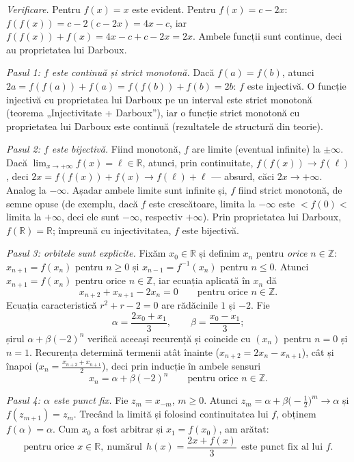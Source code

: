 \emph{Verificare.} Pentru $f(x)=x$ este evident. Pentru $f(x)=c-2x$: $f(f(x))=c-2(c-2x)=4x-c$, iar $f(f(x))+f(x)=4x-c+c-2x=2x$. Ambele funcții sunt continue, deci au proprietatea lui Darboux.

\emph{Pasul 1: $f$ este continuă și strict monotonă.} Dacă $f(a)=f(b)$, atunci $2a=f(f(a))+f(a)=f(f(b))+f(b)=2b$: $f$ este injectivă. O funcție injectivă cu proprietatea lui Darboux pe un interval este strict monotonă (teorema „Injectivitate + Darboux''), iar o funcție strict monotonă cu proprietatea lui Darboux este continuă (rezultatele de structură din teorie).

\emph{Pasul 2: $f$ este bijectivă.} Fiind monotonă, $f$ are limite (eventual infinite) la $\pm\infty$. Dacă $\lim_{x\to+\infty}f(x)=\ell\in\mathbb{R}$, atunci, prin continuitate, $f(f(x))\to f(\ell)$, deci $2x=f(f(x))+f(x)\to f(\ell)+\ell$ --- absurd, căci $2x\to+\infty$. Analog la $-\infty$. Așadar ambele limite sunt infinite și, $f$ fiind strict monotonă, de semne opuse (de exemplu, dacă $f$ este crescătoare, limita la $-\infty$ este $<f(0)<$ limita la $+\infty$, deci ele sunt $-\infty$, respectiv $+\infty$). Prin proprietatea lui Darboux, $f(\mathbb{R})=\mathbb{R}$; împreună cu injectivitatea, $f$ este bijectivă.

\emph{Pasul 3: orbitele sunt explicite.} Fixăm $x_0\in\mathbb{R}$ și definim $x_n$ pentru \emph{orice} $n\in\mathbb{Z}$: $x_{n+1}=f(x_n)$ pentru $n\ge0$ și $x_{n-1}=f^{-1}(x_n)$ pentru $n\le0$. Atunci $x_{n+1}=f(x_n)$ pentru orice $n\in\mathbb{Z}$, iar ecuația aplicată în $x_n$ dă
\[ x_{n+2}+x_{n+1}-2x_n=0\qquad\text{pentru orice }n\in\mathbb{Z} . \]
Ecuația caracteristică $r^2+r-2=0$ are rădăcinile $1$ și $-2$. Fie
\[ \alpha=\frac{2x_0+x_1}{3},\qquad \beta=\frac{x_0-x_1}{3} ; \]
șirul $\alpha+\beta(-2)^n$ verifică aceeași recurență și coincide cu $(x_n)$ pentru $n=0$ și $n=1$. Recurența determină termenii atât înainte ($x_{n+2}=2x_n-x_{n+1}$), cât și înapoi ($x_n=\frac{x_{n+2}+x_{n+1}}{2}$), deci prin inducție în ambele sensuri
\[ x_n=\alpha+\beta(-2)^n\qquad\text{pentru orice }n\in\mathbb{Z} . \]

\emph{Pasul 4: $\alpha$ este punct fix.} Fie $z_m=x_{-m}$, $m\ge0$. Atunci $z_m=\alpha+\beta\bigl(-\tfrac12\bigr)^m\to\alpha$ și $f(z_{m+1})=z_m$. Trecând la limită și folosind continuitatea lui $f$, obținem $f(\alpha)=\alpha$. Cum $x_0$ a fost arbitrar și $x_1=f(x_0)$, am arătat:
\[ \text{pentru orice }x\in\mathbb{R},\ \text{numărul}\ \ h(x)=\frac{2x+f(x)}{3}\ \ \text{este punct fix al lui }f . \tag{$\ast$} \]

